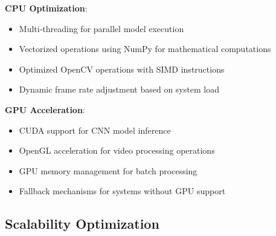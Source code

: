 \documentclass[12pt,a4paper]{article}
\begin{document}
\textbf{CPU Optimization}:
\begin{itemize}
    \item Multi-threading for parallel model execution
    \item Vectorized operations using NumPy for mathematical computations
    \item Optimized OpenCV operations with SIMD instructions
    \item Dynamic frame rate adjustment based on system load
\end{itemize}

\textbf{GPU Acceleration}:
\begin{itemize}
    \item CUDA support for CNN model inference
    \item OpenGL acceleration for video processing operations
    \item GPU memory management for batch processing
    \item Fallback mechanisms for systems without GPU support
\end{itemize}

\subsection{Scalability Optimization}
\end{document}
